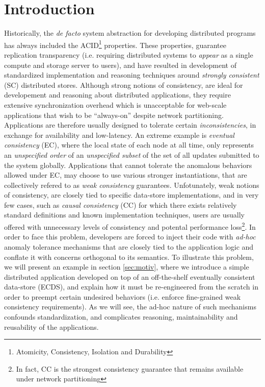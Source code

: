 \section{Introduction}
\label{sec:intro}
Historically,
the \emph{de facto} system abstraction for developing distributed
programs has always included the 
ACID\footnote{Atomicity, Consistency, Isolation and
Durability} properties.
These properties, guarantee replication transparency  (i.e. requiring distributed
systems to \emph{appear} as a single compute and storage server to
users), and have resulted in development of standardized implementation and
reasoning techniques around \emph{strongly consistent} (SC) distributed
stores.
Although strong notions of consistency, are ideal for developement and
reasoning about distributed applications, 
they require extensive synchronization overhead which is unacceptable
for web-scale applications that wish to be ``always-on'' despite network
partitioning. Applications are therefore usually designed to tolerate
certain \emph{inconsistencies}, in exchange for availability and
low-latency. 
An extreme example is \emph{eventual consistency} (EC), where
the local state of each node at all time,
only represents an \emph{unspecified order} of an \emph{unspecified
subset} of the set of all updates submitted to the system globally.
Applications that  cannot tolerate the anomalous behaviors allowed under
EC, may choose to use various stronger instantiations, that are
collectively refered to as \emph{weak consistency} guarantees. 
Unfotunately, weak notions of consistency, are closely tied to  
specific data-store implementations, and in very few cases, such as 
\emph{causal consistency} (CC) for which there exists
relatively standard definitions and known implementation techniques,
users are usually offered with unnecessary levels of consistency and potental
performance loss\footnote{In fact, CC is the
strongest consistency guarantee that remains available under network
partitioning}. In order to face this problem, developers are forced to
inject their code with \emph{ad-hoc} anomaly tolerance mechanisms that are closely
tied to the application logic and conflate it with concerns orthogonal
to its semantics.
To illustrate this problem, we will present an example in section
\ref{sec:motiv}, where we introduce a simple distributed application
developed on top of an off-the-shelf eventually consistent data-store
(ECDS), and explain how it must be re-engineered from the scratch in
order to preempt certain undesired behaviors (i.e. enforce fine-grained
weak consistency requirements). As we will see, the ad-hoc
nature of such mechanisms confounds standardization, and complicates
reasoning, maintainability and reusability of the applications.

